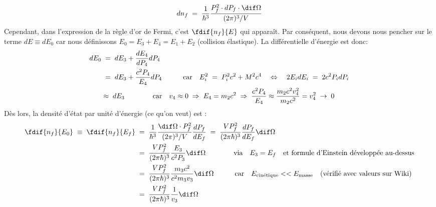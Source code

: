 \begin{equation*}
    dn_f \eq \dfrac{1}{\hbar^3}\dfrac{P^{2}_f \cdot dP_f \cdot \dif\Omega}{(2\pi)^3 / V}
\end{equation*}
 Cependant, dans l'expression de la règle d'or de Fermi, c'est $ \fdif{n_f}{E}$ qui apparaît. Par conséquent, nous devons nous pencher sur le terme $dE\equiv dE_0$ car nous définissons $E_0 = E_3 + E_4 = E_1 + E_2$ (collision élastique). La différentielle d'énergie est donc:
\begin{align*}
    dE_0 
        &\; = \; 
    dE_3 + \dfrac{dE_4}{dP_4}dP_4\\
        &\; = \;
    dE_3 + \dfrac{c^2 P_4}{E_4}dP_4 
    \qquad \quad \text{car} \quad
    E_i^2 \; = \; P_i^2c^2 + M^2c^4
    \quad \Leftrightarrow \quad
    2E_idE_i \; = \; 2c^2 P_i dP_i\\
        &\approx\;
    dE_3  \qquad \qquad \text{car} \quad v_4 \approx 0 \;\Rightarrow\; E_4 = m_2c^2 \;\Rightarrow\; \dfrac{c^2P_4}{E_4} \approx \dfrac{m_2c^2v_4^2}{m_2c^2} = v_4^2 \;\rightarrow\; 0
\end{align*}
Dès lors, la densité d'état par unité d'énergie (ce qu'on veut) est :
\begin{align*}
    \fdif{n_f}{E_0} \;\equiv\; \fdif{n_f}{E_f}
        &\eq
    \dfrac{1}{\hbar^3}\dfrac{ \dif\Omega \cdot P^{2}_f}{(2\pi)^3 / V} \dfrac{dP_f}{dE_f}
    \eq
    \dfrac{V P_f^2}{(2\pi\hbar)^3} \dfrac{dP_f}{dE_f} \dif\Omega
    \\
        &\eq
    \dfrac{V P_f^2}{(2\pi\hbar)^3} \dfrac{E_3}{c^2P_3} \dif\Omega
    \qquad \qquad \text{via} \quad E_3=E_f \quad \text{et formule d'Einstein développée au-dessus} \\ 
        &\eq
    \dfrac{V P_f^2}{(2\pi\hbar)^3}\dfrac{m_3 c^2}{c^2 m_3 v_3}  \dif\Omega
    \qquad \quad \text{car} \quad E_{\text{cinétique}} << E_{\text{masse}} \quad \text{(vérifié avec valeurs sur Wiki)}\\
        &\eq
    \dfrac{V P_f^2}{(2\pi\hbar)^3}\dfrac{1}{v_3}  \dif\Omega
\end{align*}


